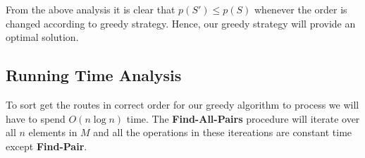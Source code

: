 \documentclass[8pt]{article}
\begin{document}
From the above analysis it is clear that $p(S') \leq p(S)$ whenever the order is changed according to greedy strategy. Hence, our greedy strategy will provide an optimal solution.

\subsection{Running Time Analysis}
To sort get the routes in correct order for our greedy algorithm to process we will have to spend $O(n\log{n})$ time. The \textbf{Find-All-Pairs} procedure will iterate over all $n$ elements in $M$ and all the operations in these itereations are constant time except \textbf{Find-Pair}.
\end{document}

